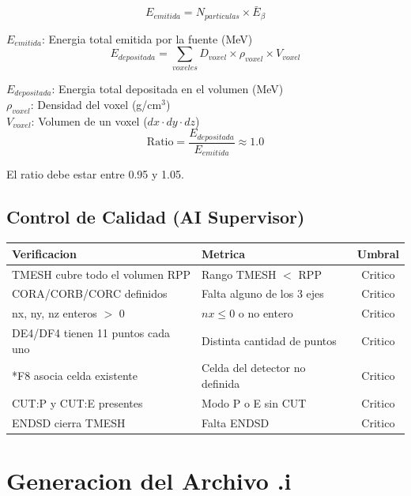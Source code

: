\documentclass[12pt,a4paper]{article}
\newcommand{\vardef}[2]{\noindent\textbf{#1}: #2\\}
\begin{document}
$$
E_{emitida} = N_{particulas} \times \bar{E}_{\beta}
$$

\vardef{$E_{emitida}$}{Energia total emitida por la fuente (MeV)}

$$
E_{depositada} = \sum_{voxeles} D_{voxel} \times \rho_{voxel} \times V_{voxel}
$$

\vardef{$E_{depositada}$}{Energia total depositada en el volumen (MeV)}
\vardef{$\rho_{voxel}$}{Densidad del voxel (g/cm$^3$)}
\vardef{$V_{voxel}$}{Volumen de un voxel ($dx \cdot dy \cdot dz$)}

$$
\text{Ratio} = \frac{E_{depositada}}{E_{emitida}} \approx 1.0
$$

El ratio debe estar entre 0.95 y 1.05.

\subsection{Control de Calidad (AI Supervisor)}

\begin{table}[H]
\centering
\begin{tabular}{llc}
\toprule
\textbf{Verificacion} & \textbf{Metrica} & \textbf{Umbral} \\
\midrule
TMESH cubre todo el volumen RPP & Rango TMESH $<$ RPP & Critico \\
CORA/CORB/CORC definidos & Falta alguno de los 3 ejes & Critico \\
nx, ny, nz enteros $>$ 0 & $nx \leq 0$ o no entero & Critico \\
DE4/DF4 tienen 11 puntos cada uno & Distinta cantidad de puntos & Critico \\
*F8 asocia celda existente & Celda del detector no definida & Critico \\
CUT:P y CUT:E presentes & Modo P o E sin CUT & Critico \\
ENDSD cierra TMESH & Falta ENDSD & Critico \\
\bottomrule
\end{tabular}
\end{table}

\newpage

\section{Generacion del Archivo .i}
\label{sec:generacion}
\end{document}
